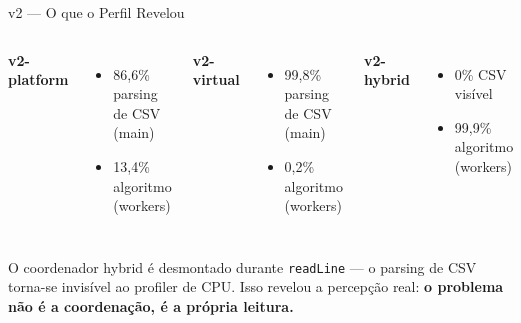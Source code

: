 \begin{frame}{v2 --- O que o Perfil Revelou}
    \begin{columns}
        \textbf{v2-platform}
        \begin{itemize}
            \item 86,6\% parsing de CSV (main)
            \item 13,4\% algoritmo (workers)
        \end{itemize}

        \textbf{v2-virtual}
        \begin{itemize}
            \item 99,8\% parsing de CSV (main)
            \item 0,2\% algoritmo (workers)
        \end{itemize}

        \textbf{v2-hybrid}
        \begin{itemize}
            \item 0\% CSV visível
            \item 99,9\% algoritmo (workers)
        \end{itemize}
    \end{columns}

    \bigskip
    O coordenador hybrid é desmontado durante \texttt{readLine} --- o parsing de CSV
    torna-se invisível ao profiler de CPU. Isso revelou a percepção real: \textbf{o
    problema não é a coordenação, é a própria leitura.}
\end{frame}
